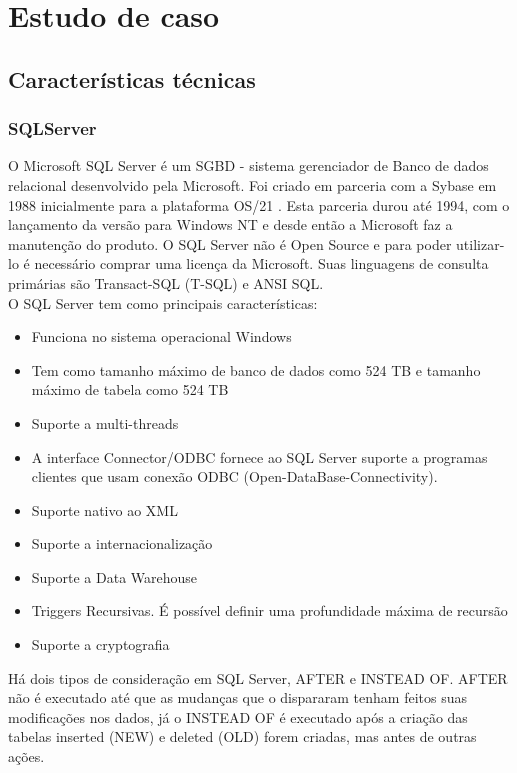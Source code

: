 \documentclass[conference]{IEEEtran}
\begin{document}
\section{Estudo de caso}
  \subsection{Características técnicas}
    \subsubsection{SQLServer }
    O Microsoft SQL Server é um SGBD - sistema gerenciador de Banco de dados relacional desenvolvido pela Microsoft. Foi criado em parceria com a Sybase em 1988 inicialmente para a plataforma OS/21 . Esta parceria durou até 1994, com o lançamento da versão para Windows NT e desde então a Microsoft faz a manutenção do produto. O SQL Server não é Open Source e para poder utilizar-lo é necessário comprar uma licença da Microsoft. Suas linguagens de consulta primárias são Transact-SQL (T-SQL) e ANSI SQL.\cite{sql-server-site}\\
    
    O SQL Server tem como principais características:
    \begin{itemize}
      \item Funciona no sistema operacional Windows
      \item Tem como tamanho máximo de banco de dados como 524 TB  e tamanho máximo de tabela como 524 TB
      \item Suporte a multi-threads
      \item A interface Connector/ODBC fornece ao SQL Server suporte a programas clientes que usam conexão ODBC (Open-DataBase-Connectivity).
      \item Suporte nativo ao XML
      \item Suporte a internacionalização
      \item Suporte a Data Warehouse
      \item Triggers Recursivas. É possível definir uma profundidade máxima de recursão
      \item Suporte a cryptografia
    \end{itemize}


	Há dois tipos de consideração em SQL Server, AFTER e INSTEAD OF. AFTER não é executado até que as mudanças que o dispararam tenham feitos suas modificações nos dados, já o INSTEAD OF é executado após a criação das tabelas inserted (NEW) e deleted (OLD) forem criadas, mas antes de outras ações.\cite{caracteristica-mssql} \cite{caracteristica-mssql2}
\end{document}
